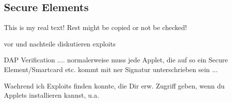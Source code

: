 \subsection{Secure Elements}\label{subsection:evaluation-external-secure}
This is my real text! Rest might be copied or not be checked!


vor und nachteile diskutieren
exploits


DAP Verification .... normalerweise muss jede Applet, die auf so ein Secure Element/Smartcard etc. kommt mit ner Signatur unterschrieben sein ...


Waehrend ich Exploits finden konnte, die Dir erw. Zugriff geben, wenn du Applets installieren kannst, u.a.
